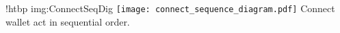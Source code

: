 \namedfigure
{!htbp}
{img:ConnectSeqDig}
{\texttt{[image: connect\_sequence\_diagram.pdf]}}
{Connect wallet act in sequential order.}
